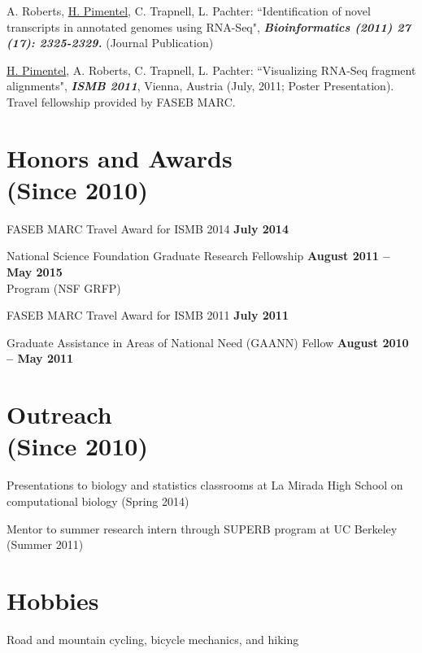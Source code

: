 \documentclass[margin,line]{res}
\begin{document}
\begin{resume}
A. Roberts, \underline{H. Pimentel}, C. Trapnell, L. Pachter: ``Identification
of novel transcripts in annotated genomes using RNA-Seq", {\bf
  \emph{Bioinformatics (2011) 27 (17): 2325-2329.}} (Journal Publication)

\underline{H. Pimentel}, A. Roberts, C. Trapnell, L. Pachter: ``Visualizing
RNA-Seq fragment alignments", {\bf \emph{ISMB 2011}}, Vienna, Austria (July,
2011; Poster Presentation). Travel fellowship provided by FASEB MARC.

\section{\sc Honors and Awards \\ (Since 2010)}
FASEB MARC Travel Award for ISMB 2014 \hfill {\bf July 2014}

National Science Foundation Graduate Research Fellowship \hfill {\bf August 2011 -- May 2015} \\
Program (NSF GRFP)

FASEB MARC Travel Award for ISMB 2011 \hfill {\bf July 2011}

Graduate Assistance in Areas of National Need (GAANN) Fellow \hfill {\bf August
  2010 -- May 2011}


\section{\sc Outreach \\ (Since 2010)}
Presentations to biology and statistics classrooms at La Mirada High School on
computational biology (Spring 2014)

Mentor to summer research intern through SUPERB program at UC Berkeley (Summer
2011)

\vspace{-.25cm}

\section{\sc Hobbies}
Road and mountain cycling, bicycle mechanics, and hiking
\end{resume}
\end{document}
